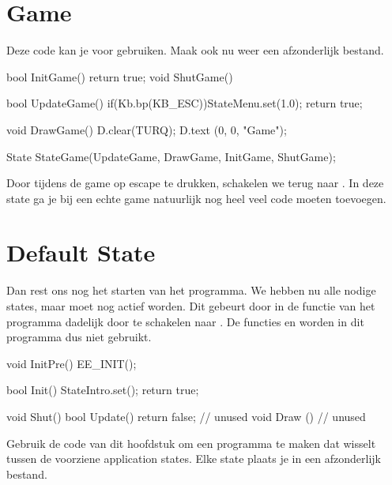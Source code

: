 \section{Game}
Deze code kan je voor  gebruiken. Maak ook nu weer een afzonderlijk bestand.
\begin{code}
bool InitGame() {return true;}
void ShutGame() {}

bool UpdateGame()
{
   if(Kb.bp(KB_ESC))StateMenu.set(1.0);
   return true;
}

void DrawGame()
{
   D.clear(TURQ);
   D.text (0, 0, "Game");
}

State StateGame(UpdateGame, DrawGame, InitGame, ShutGame);
\end{code}

Door tijdens de game op escape te drukken, schakelen we terug naar . In deze state ga je bij een echte game natuurlijk nog heel veel code moeten toevoegen.

\section{Default State}
Dan rest ons nog het starten van het programma. We hebben nu alle nodige states, maar  moet nog actief worden. Dit gebeurt door in de  functie van het programma dadelijk door te schakelen naar . De functies  en  worden in dit programma dus niet gebruikt.

\begin{code}
void InitPre()
{
   EE_INIT();
}

bool Init()
{
   StateIntro.set();
   return true;
}

void Shut() {}
bool Update() {return false;} // unused
void Draw  () {             } // unused
\end{code}

\begin{exercise}
Gebruik de code van dit hoofdstuk om een programma te maken dat wisselt tussen de voorziene application states. Elke state plaats je in een afzonderlijk bestand.
\end{exercise}